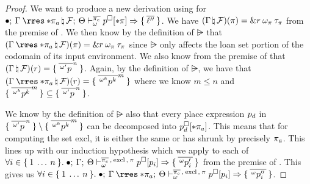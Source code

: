 \begin{proof}
  We want to produce a new derivation using  for
  $\oxmusafetyinner{\oxemptyctx}{\oxkontctx}{
    \oxnewframe{\oxrsub{\oxvarctx}{\oxderef{\oxplace_a}}}{\oxframe}
  }{\oxmuta}{
    \overline{\oxplace_e}
  }{
    \oxplaceexprctx[\oxderef{\oxplace}]
  }{
    \oxset{\overline{\oxloan^{\prime\prime}}}
  }$. We have $(\Gamma \, \natural \, \mathcal{F})(\pi) = 
    \& r \: \omega_\pi \: \tau_\pi
 $ from the premise of . We then know by the definition of
  $\rsub$ that $\oxlookup{
    (\oxnewframe{\oxrsub{\oxvarctx}{\oxderef{\oxplace_a}}}{\oxframe})
  }{\oxplace}{
    \oxtref{\oxcprov}{\oxmuta_\oxplace}{\oxtype_\oxplace}
  }$ since $\rsub$ only affects the loan set portion of the codomain of its
  input environment. We also know from the premise of  that
  $
    (\Gamma \, \natural \, \mathcal{F})
  (r) = 
    \{ \: \overline{\,^{\omega^\prime}p\,}^n \: \}
 $. Again, by the definition of $\rsub$, we have that
  $\oxlookup{
    (\oxnewframe{\oxrsub{\oxvarctx}{\oxderef{\oxplace_a}}}{\oxframe})
  }{\oxcprov}{
    \oxset{\overline{\oxloanpkg{\oxmuta^k}{\oxplaceexpr^k}}^m}
  }$ where we know $m \leq n$ and
  $\{ \: \overline{\,^{\omega^k}p^k\,}^m \: \} \subseteq
  \{ \: \overline{\,^{\omega^\prime}p\,}^n \: \}$.

  We know by the definition of $\rsub$ also that every place expression
  $p_d$ in
  $\{ \: \overline{\,^{\omega^\prime}p\,}^n \: \} \setminus \{ \: \overline{\,^{\omega^k}p^k\,}^m \: \}$
  can be decomposed into $p^\square_d[* \pi_a]$. This means
  that for computing the set $\textrm{excl}$, it is either the same or has
  shrunk by precisely $\pi_a$. This lines up with our induction hypothesis
  which we apply to each of $\forall i \in \{ \: 1 \: \ldots \: n \: \}. \;
  \bullet; \: \Gamma; \: \Theta \vdash^{
    \overline{\pi_e} \, , \: \textrm{excl} \, , \: \pi
  }_{\omega} 
    p^\square[p_i]
   \Rightarrow 
    \{ \: \overline{\,^{\omega}p_i^\prime\,} \: \}
  $ from the premise of . This gives us
  $\forall i \in \oxset{1 \oxdots n}. \;
  \oxmusafetyinner{\oxemptyctx}{\oxkontctx}{
    \oxrsub{\oxvarctx}{\oxderef{\oxplace_a}}
  }{\oxmuta}{
    \overline{\oxplace_e} \oxcomma \textrm{excl} \oxcomma \oxplace
  }{
    \oxplaceexprctx[\oxplaceexpr_i]
  }{
    \oxset{\overline{\oxloanpkg{\oxmuta}{\oxplaceexpr_i^{\prime\prime}}}}
  }$.


\end{proof}
